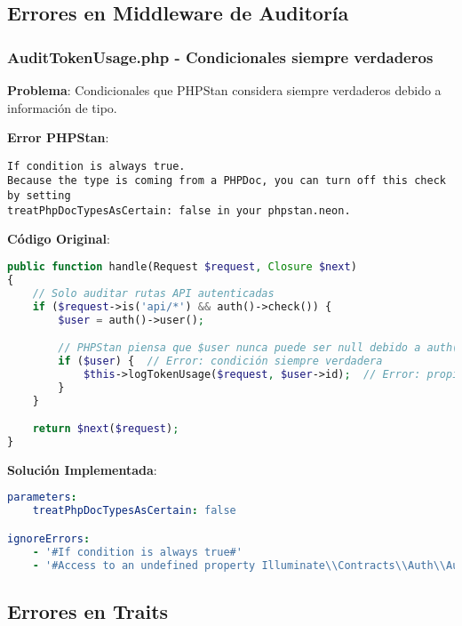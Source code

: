 \documentclass[12pt,a4paper]{article}
\begin{document}
\subsection{Errores en Middleware de Auditoría}

\subsubsection{AuditTokenUsage.php - Condicionales siempre verdaderos}

\textbf{Problema}: Condicionales que PHPStan considera siempre verdaderos debido a información de tipo.

\textbf{Error PHPStan}:
\begin{lstlisting}[caption=Error en AuditTokenUsage.php]
If condition is always true.
Because the type is coming from a PHPDoc, you can turn off this check by setting
treatPhpDocTypesAsCertain: false in your phpstan.neon.
\end{lstlisting}

\textbf{Código Original}:
\begin{lstlisting}[language=php, caption=AuditTokenUsage.php - Condicional problemático]
public function handle(Request $request, Closure $next)
{
    // Solo auditar rutas API autenticadas
    if ($request->is('api/*') && auth()->check()) {
        $user = auth()->user();

        // PHPStan piensa que $user nunca puede ser null debido a auth()->check()
        if ($user) {  // Error: condición siempre verdadera
            $this->logTokenUsage($request, $user->id);  // Error: propiedad no detectada
        }
    }

    return $next($request);
}
\end{lstlisting}

\textbf{Solución Implementada}:
\begin{lstlisting}[language=yaml, caption=Configuración para condicionales]
parameters:
    treatPhpDocTypesAsCertain: false

ignoreErrors:
    - '#If condition is always true#'
    - '#Access to an undefined property Illuminate\\Contracts\\Auth\\Authenticatable::\$id#'
\end{lstlisting}

\subsection{Errores en Traits}
\end{document}
